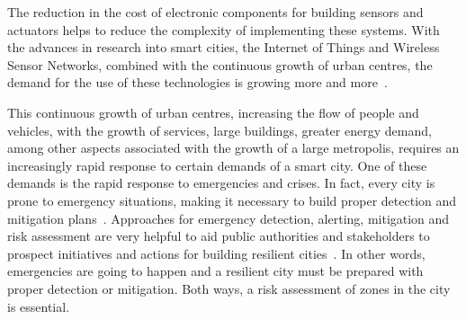 \begin{refsection}
The reduction in the cost of electronic components for building sensors and actuators helps to reduce the complexity of implementing these systems. With the advances in research into smart cities, the Internet of Things and Wireless Sensor Networks, combined with the continuous growth of urban centres, the demand for the use of these technologies is growing more and more~\cite{8472005}.

This continuous growth of urban centres, increasing the flow of people and vehicles, with the growth of services, large buildings, greater energy demand, among other aspects associated with the growth of a large metropolis, requires an increasingly rapid response to certain demands of a smart city. One of these demands is the rapid response to emergencies and crises. In fact, every city is prone to emergency situations, making it necessary to build proper detection and mitigation plans~\cite{Gosavi2020582}. Approaches for emergency detection, alerting, mitigation and risk assessment are very helpful to aid public authorities and stakeholders to prospect initiatives and actions for building resilient cities~\cite{bodoque2016improvement}. In other words, emergencies are going to happen and a resilient city must be prepared with proper detection or mitigation. Both ways, a risk assessment of zones in the city is essential.



\end{refsection}
